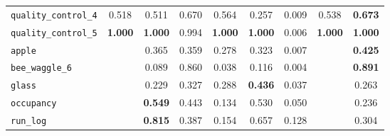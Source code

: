 \begin{tabular}{lcccccccc}
\verb+quality_control_4+ & 0.518 & 0.511 & 0.670 & 0.564 & 0.257 & 0.009 & 0.538 & \textbf{0.673}\\
\verb+quality_control_5+ & \textbf{1.000} & \textbf{1.000} & 0.994 & \textbf{1.000} & \textbf{1.000} & 0.006 & \textbf{1.000} & \textbf{1.000}\\
\midrule
\verb+apple+ &  & 0.365 & 0.359 & 0.278 & 0.323 & 0.007 &  & \textbf{0.425}\\
\verb+bee_waggle_6+ &  & 0.089 & 0.860 & 0.038 & 0.116 & 0.004 &  & \textbf{0.891}\\
\verb+glass+ &  & 0.229 & 0.327 & 0.288 & \textbf{0.436} & 0.037 &  & 0.263\\
\verb+occupancy+ &  & \textbf{0.549} & 0.443 & 0.134 & 0.530 & 0.050 &  & 0.236\\
\verb+run_log+ &  & \textbf{0.815} & 0.387 & 0.154 & 0.657 & 0.128 &  & 0.304\\
\bottomrule
\end{tabular}
